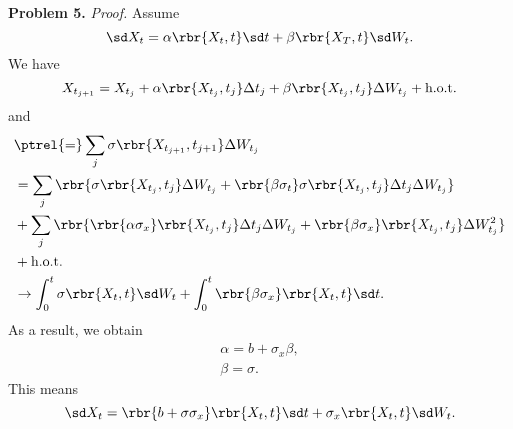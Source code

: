 \documentclass[english, nochinese]{pnote}
\begin{document}
\textbf{Problem 5.} \textit{Proof.} Assume
\begin{equation}
\sd X_t = \alpha \rbr{ X_t, t } \sd t + \beta \rbr{ X_T, t } \sd W_t.
\end{equation}
We have
\begin{equation}
X_{t_{ j + 1 }} = X_{t_j} + \alpha \rbr{ X_{t_j}, t_j } \Delta t_j + \beta \rbr{ X_{t_j}, t_j } \Delta W_{t_j} + \text{h.o.t.}
\end{equation}
and
\begin{equation}
\begin{split}
&\ptrel{=} \sum_j \sigma \rbr{ X_{t_{ j + 1 }}, t_{ j + 1 } } \Delta W_{t_{j}} \\
&= \sum_j \rbr{ \sigma \rbr{ X_{t_j}, t_j } \Delta W_{t_j} + \rbr{ \beta \sigma_t } \sigma \rbr{ X_{t_j}, t_j } \Delta t_j \Delta W_{t_j} } \\
&+ \sum_j \rbr{ \rbr{ \alpha \sigma_x } \rbr{ X_{t_j}, t_j } \Delta t_j \Delta W_{t_j} + \rbr{ \beta \sigma_x } \rbr{ X_{t_j}, t_j } \Delta W_{t_j}^2 } \\
&+ \text{h.o.t.} \\
&\rightarrow \int_0^t \sigma \rbr{ X_t, t } \sd W_t + \int_0^t \rbr{ \beta \sigma_x } \rbr{ X_t, t } \sd t.
\end{split}
\end{equation}
As a result, we obtain
\begin{gather}
\alpha = b + \sigma_x \beta, \\
\beta = \sigma.
\end{gather}
This means
\begin{equation}
\sd X_t = \rbr{ b + \sigma \sigma_x } \rbr{ X_t, t } \sd t + \sigma_x \rbr{ X_t, t } \sd W_t.
\end{equation}
\end{document}
